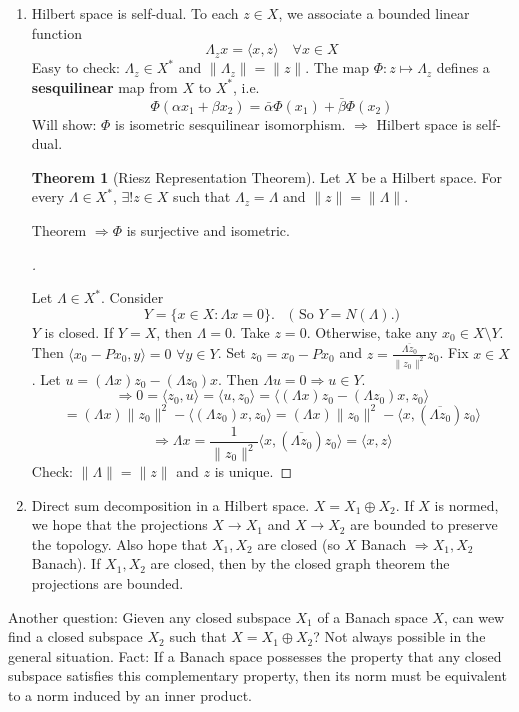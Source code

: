 \documentclass{article}
\theoremstyle{definition}
\newtheorem{thm}{Theorem}
\newenvironment{proofs}[1][\proofname]{%
  \begin{proof}[#1]$ $\par\nobreak\ignorespaces
}{%
  \end{proof}
}
\begin{document}
\begin{enumerate}
	\item Hilbert space is self-dual.
		To each $z \in X$, we associate a bounded linear function 
		\[
			\Lambda_z x = \langle x, z \rangle \quad \forall x \in X
		\]
		Easy to check: $\Lambda_z \in X^*$ and $\|\Lambda_z\| = \|z\|$.
		The map $\Phi: z \mapsto \Lambda_z$ defines a \textbf{sesquilinear} map from $X$ to $X^*$, i.e.
		\[
			\Phi(\alpha x_1 + \beta x_2) = \bar{\alpha} \Phi(x_1) + \bar{\beta} \Phi(x_2)
		\]
		Will show: $\Phi$ is isometric sesquilinear isomorphism.
		$\Rightarrow$ Hilbert space is self-dual.
		\begin{thm}[Riesz Representation Theorem]
			Let $X$ be a Hilbert space.
			For every $\Lambda \in X^*$, $\exists ! z \in X$ such that $\Lambda_z = \Lambda$ and $\|z\| = \|\Lambda\|$.
		\end{thm}
		Theorem $\Rightarrow \Phi$ is surjective and isometric.
		\begin{proofs}
			Let $\Lambda \in X^*$.
			Consider 
			\[
				Y = \{ x \in X: \Lambda x = 0\}. \quad \text{( So } Y = N(\Lambda) \text{.)}
			\]
			$Y$ is closed.
			If $Y = X$, then $\Lambda = 0$.
			Take $z = 0$.
			Otherwise, take any $x_0 \in X \setminus Y$.
			Then $\langle x_0 - P x_0, y \rangle = 0$ $\forall y \in Y$.
			Set $z_0 = x_0 - P x_0$ and $z = \frac{\overline{\Lambda z_0}}{\|z_0\|^2} z_0$.
			Fix $x \in X$.
			Let $u = (\Lambda x) z_0 - (\Lambda z_0) x$.
			Then $\Lambda u = 0 \Rightarrow u \in Y$.
			\[
				\Rightarrow 0 = \langle z_0, u \rangle = \langle u, z_0 \rangle = \langle (\Lambda x) z_0 - (\Lambda z_0) x, z_0 \rangle
			\]
			\[
				= (\Lambda x) \|z_0\|^2 - \langle(\Lambda z_0) x, z_0 \rangle = (\Lambda x) \|z_0\|^2 - \langle x, (\overline{\Lambda z_0}) z_0 \rangle
			\]
			\[
				\Rightarrow \Lambda x = \frac{1}{\|z_0\|^2} \langle x, (\overline{\Lambda z_0}) z_0 \rangle = \langle x, z \rangle
			\]
			Check: $\|\Lambda\| = \|z\|$ and $z$ is unique.
		\end{proofs}

	\item Direct sum decomposition in a Hilbert space.
		$X = X_1 \oplus X_2$.
		If $X$ is normed, we hope that the projections $X \to X_1$ and $X \to X_2$ are bounded to preserve the topology.
		Also hope that $X_1, X_2$ are closed (so $X$ Banach $\Rightarrow X_1, X_2$ Banach).
		If $X_1, X_2$ are closed, then by the closed graph theorem the projections are bounded.
\end{enumerate}

Another question: Gieven any closed subspace $X_1$ of a Banach space $X$, can wew find a closed subspace $X_2$ such that $X = X_1 \oplus X_2$?
Not always possible in the general situation.
Fact: If a Banach space possesses the property that any closed subspace satisfies this complementary property, then its norm must be equivalent to a norm induced by an inner product.
\end{document}

